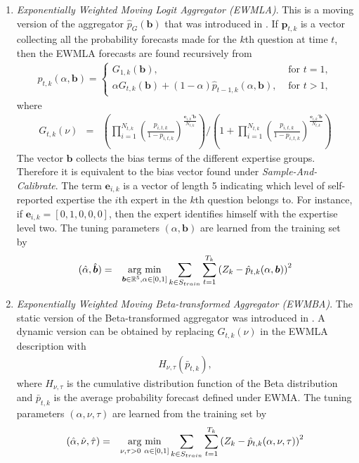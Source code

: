 \documentclass[aoas, preprint]{imsart}
\newcommand{\argmin}{\operatornamewithlimits{arg\ min}}
\numberwithin{equation}{section}
\theoremstyle{plain}
\newcommand{\R}{\mathbb{R}}
\begin{document}
\begin{enumerate}
\begin{enumerate}
 
\item  \textit{Exponentially Weighted Moving Logit Aggregator (EWMLA)}. This is a moving version of the aggregator $\hat{p}_G(\boldsymbol{b})$ that was introduced in \cite{satopaa}. If $\boldsymbol{p}_{t,k}$ is a vector collecting all the probability forecasts made for the $k$th question at time $t$, then the EWMLA forecasts are found recursively from
\begin{eqnarray*}
\hat{p}_{t,k}(\alpha, \boldsymbol{b}) =
\begin{cases}
G_{1,k}(\boldsymbol{b} ), & \text{ for } t  = 1, \\
\alpha G_{t,k}(\boldsymbol{b} )  + (1-\alpha) \hat{p}_{t-1,k}(\alpha, \boldsymbol{b}),  & \text{ for } t > 1,
\end{cases}
\end{eqnarray*}
where
\small
\begin{eqnarray*}
G_{t,k}(\nu )  &=& \left( \prod\limits_{i=1}^{N_{t,k}} \left( \frac{p_{i, t, k}}{1-p_{i, t, k}} \right)^{ \frac{\boldsymbol{e}_{i,k}'\boldsymbol{b}}{N_{t,k}}} \right) \Bigg/ \left(1+ \prod\limits_{i=1}^{N_{t,k}} \left( \frac{p_{i, t, k}}{1-p_{i, t, k}} \right)^{\frac{\boldsymbol{e}_{i,k}' \boldsymbol{b}}{N_{t,k}}} \right)
\end{eqnarray*}
\normalsize
The vector $\boldsymbol{b}$ collects the bias terms of the different expertise groups. Therefore it is equivalent to the bias vector found under \textit{Sample-And-Calibrate}. The term $\boldsymbol{e}_{i,k}$ is a vector of length 5 indicating which level of self-reported expertise the $i$th expert in the $k$th question belongs to. For instance, if $\boldsymbol{e}_{i,k} = [0, 1, 0, 0, 0]$, then the expert identifies himself with the expertise level two. The tuning parameters $(\alpha, \boldsymbol{b})$ are learned from the training set by
\begin{eqnarray*}
(\hat{\alpha}, \hat{ \boldsymbol{b}}) &=& \argmin_{ \boldsymbol{b} \in \R^5, \alpha \in [0,1]} \sum_{k \in S_{train}} \sum_{t=1}^{T_k} \left(Z_k - \hat{p}_{t,k}(\alpha,  \boldsymbol{b})\right)^2
\end{eqnarray*}


\item  \textit{Exponentially Weighted Moving Beta-transformed Aggregator (EWMBA)}. The static version of the Beta-transformed  aggregator was introduced in \cite{Ranjan08}. A dynamic version can be obtained by replacing $G_{t,k}(\nu )$ in the EWMLA description with
\begin{eqnarray*}
H_{\nu, \tau} \left( \bar{p}_{t,k}\right),
\end{eqnarray*}
where $H_{\nu, \tau}$ is the cumulative distribution function of the Beta distribution and $\bar{p}_{t,k}$ is the average probability forecast defined under EWMA. The tuning parameters $(\alpha, \nu, \tau)$ are learned from the training set by
\begin{eqnarray*}
(\hat{\alpha}, \hat{\nu}, \hat{\tau}) &=& \argmin_{\nu, \tau > 0\ \alpha \in [0,1]} \sum_{k \in S_{train}} \sum_{t=1}^{T_k} \left(Z_k - \hat{p}_{t,k}(\alpha, \nu, \tau)\right)^2
\end{eqnarray*} 


\end{enumerate}
\end{enumerate}
\end{document}
